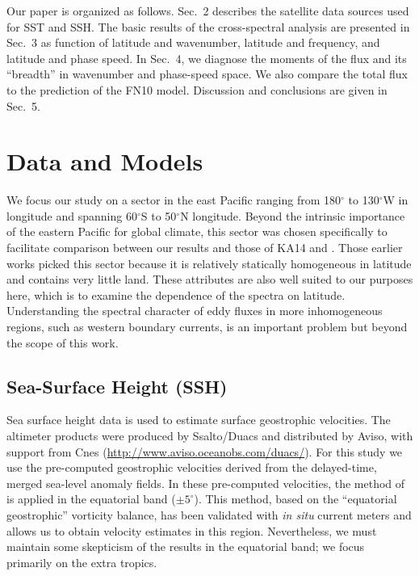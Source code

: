 \documentclass[10pt]{article}
\begin{document}

Our paper is organized as follows. Sec.~2 describes the satellite data sources used for SST and SSH. The basic results of the cross-spectral analysis are presented in Sec.~3 as function of latitude and wavenumber, latitude and frequency, and latitude and phase speed. In Sec.~4, we diagnose the moments of the flux and its ``breadth'' in wavenumber and phase-speed space. We also compare the total flux to the prediction of the FN10 model. Discussion and conclusions are given in Sec.~5.

\section{Data and Models}

We focus our study on a sector in the east Pacific ranging from 180$^\circ$ to 130$^\circ$W in longitude and spanning 60$^\circ$S to 50$^\circ$N longitude. Beyond the intrinsic importance of the eastern Pacific for global climate, this sector was chosen specifically to facilitate comparison between our results and those of KA14 and \citet{AbernatheyMarshall2013}. Those earlier works picked this sector because it is relatively statically homogeneous in latitude and contains very little land. These attributes are also well suited to our purposes here, which is to examine the dependence of the spectra on latitude. Understanding the spectral character of eddy fluxes in more inhomogeneous regions, such as western boundary currents, is an important problem but beyond the scope of this work.

\subsection{Sea-Surface Height (SSH)}
Sea surface height data is used to estimate surface geostrophic velocities. The altimeter products were produced by Ssalto/Duacs and distributed by Aviso, with support from Cnes (\url{http://www.aviso.oceanobs.com/duacs/}). For this study we use the pre-computed geostrophic velocities derived from the delayed-time, merged sea-level anomaly fields. In these pre-computed velocities, the method of \citet{LagerloefEtAl1999} is applied in the equatorial band ($\pm 5^\circ$). This method, based on the ``equatorial geostrophic'' vorticity balance, has been validated with {\em in situ} current meters and allows us to obtain velocity estimates in this region. Nevertheless, we must maintain some skepticism of the results in the equatorial band;  we focus primarily on the extra tropics.
\end{document}
